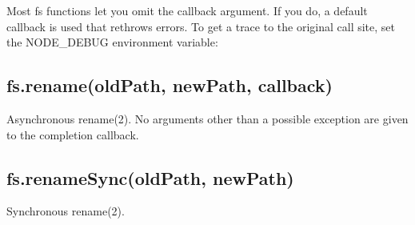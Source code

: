 Most fs functions let you omit the callback argument. If you do, a
default callback is used that rethrows errors. To get a trace to the
original call site, set the NODE\_DEBUG environment variable:

\begin{Shaded}
\begin{Highlighting}[]
 
  \NormalTok{(}\NormalTok{);}
\NormalTok{\}}

\NormalTok{:}
         
              \NormalTok{^}
    \NormalTok{:}\NormalTok{:}\NormalTok{)}
    \NormalTok{:}\NormalTok{:}\NormalTok{)}
     \NormalTok{(}\NormalTok{:}\NormalTok{:}\NormalTok{)}
    \OtherTok{/}\OtherTok{/}\NormalTok{:}\NormalTok{:}\NormalTok{)}
    \OtherTok{/}\OtherTok{/}\NormalTok{:}\NormalTok{:}\NormalTok{)}
    \NormalTok{<}
\end{Highlighting}
\end{Shaded}

\subsection{fs.rename(oldPath, newPath, callback)}

Asynchronous rename(2). No arguments other than a possible exception are
given to the completion callback.

\subsection{fs.renameSync(oldPath, newPath)}

Synchronous rename(2).

